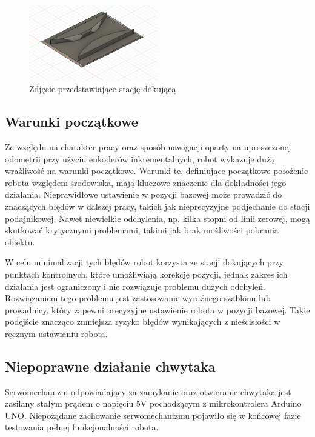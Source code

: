 \begin{figure}
    \centering
    \includegraphics[width=0.5\textwidth]{./graf/stacja-dokujaca.png}
    \caption{Zdjęcie przedstawiające stację dokującą}
    \label{fig:stacja}
\end{figure}

\subsection{Warunki początkowe}

Ze względu na charakter pracy oraz sposób nawigacji oparty na uproszczonej odometrii przy użyciu enkoderów inkrementalnych, robot wykazuje dużą wrażliwość na warunki początkowe. Warunki te, definiujące początkowe położenie robota względem środowiska, mają kluczowe znaczenie dla dokładności jego działania. Nieprawidłowe ustawienie w pozycji bazowej może prowadzić do znaczących błędów w dalszej pracy, takich jak nieprecyzyjne podjechanie do stacji podajnikowej. Nawet niewielkie odchylenia, np. kilka stopni od linii zerowej, mogą skutkować krytycznymi problemami, takimi jak brak możliwości pobrania obiektu.

W celu minimalizacji tych błędów robot korzysta ze stacji dokujących przy punktach kontrolnych, które umożliwiają korekcję pozycji, jednak zakres ich działania jest ograniczony i nie rozwiązuje problemu dużych odchyleń. Rozwiązaniem tego problemu jest zastosowanie wyraźnego szablonu lub prowadnicy, który zapewni precyzyjne ustawienie robota w pozycji bazowej. Takie podejście znacząco zmniejsza ryzyko błędów wynikających z nieścisłości w ręcznym ustawianiu robota.

\subsection{Niepoprawne działanie chwytaka}

Serwomechanizm odpowiadający za zamykanie oraz otwieranie chwytaka jest zasilany stałym prądem o napięciu 5V pochodzącym z mikrokontrolera Arduino UNO. Niepożądane zachowanie serwomechanizmu pojawiło się w końcowej fazie testowania pełnej funkcjonalności robota. 

